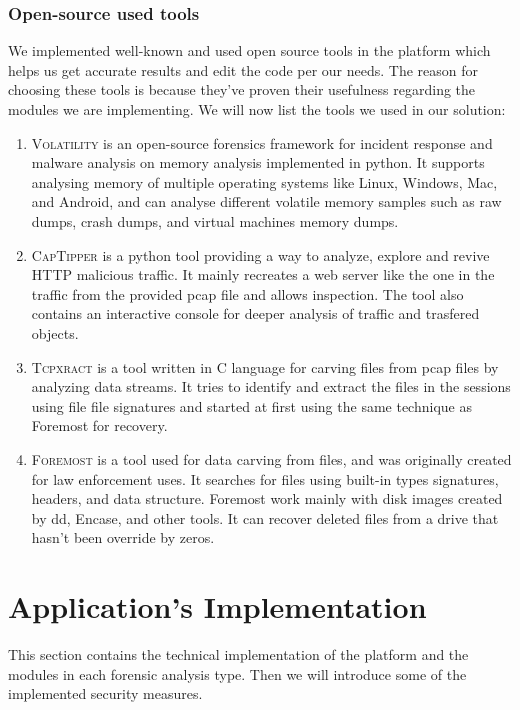 \subsubsection{Open-source used tools}
We implemented well-known and used open source tools in the platform which helps us get accurate results and edit the code per our needs. The reason for choosing these tools is because they've proven their usefulness regarding the modules we are implementing. We will now list the tools we used in our solution:
\begin{enumerate}
    \item \textsc{Volatility }
         is an open-source forensics framework for incident response and malware analysis on memory analysis implemented in python. It supports analysing memory of multiple operating systems like Linux, Windows, Mac, and Android, and can analyse different volatile memory samples such as raw dumps, crash dumps, and virtual machines memory dumps.
    \item \textsc{CapTipper }
         is a python tool providing a way to analyze, explore and revive HTTP malicious traffic. It mainly recreates a web server like the one in the traffic from the provided pcap file and allows inspection. The tool also contains an interactive console for deeper analysis of traffic and trasfered objects.
    \item \textsc{Tcpxract }
         is a tool written in C language for carving files from pcap files by analyzing data streams. It tries to identify and extract the files in the sessions using file file signatures and started at first using the same technique as Foremost for recovery.
    \item \textsc{Foremost }
         is a tool used for data carving from files, and was originally created for law enforcement uses. It searches for files using built-in types signatures, headers, and data structure. Foremost work mainly with disk images created by dd, Encase, and other tools. It can recover deleted files from a drive that hasn't been override by zeros.
\end{enumerate}


\section{Application’s Implementation}
This section contains the technical implementation of the platform and the modules in each forensic analysis type. Then we will introduce some of the implemented security measures. 
